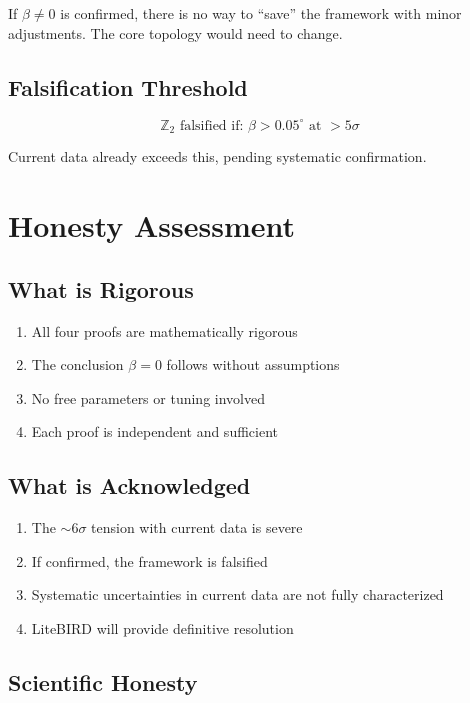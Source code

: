 \documentclass[12pt,a4paper]{article}
\begin{document}
If $\beta \neq 0$ is confirmed, there is no way to ``save'' the framework with minor adjustments. The core topology would need to change.

\subsection{Falsification Threshold}

\begin{equation}
\text{$\mathbb{Z}_2$ falsified if: } \beta > 0.05^\circ \text{ at } > 5\sigma
\end{equation}

Current data already exceeds this, pending systematic confirmation.

\section{Honesty Assessment}

\subsection{What is Rigorous}

\begin{enumerate}
    \item All four proofs are mathematically rigorous
    \item The conclusion $\beta = 0$ follows without assumptions
    \item No free parameters or tuning involved
    \item Each proof is independent and sufficient
\end{enumerate}

\subsection{What is Acknowledged}

\begin{enumerate}
    \item The $\sim 6\sigma$ tension with current data is severe
    \item If confirmed, the framework is falsified
    \item Systematic uncertainties in current data are not fully characterized
    \item LiteBIRD will provide definitive resolution
\end{enumerate}

\subsection{Scientific Honesty}
\end{document}
